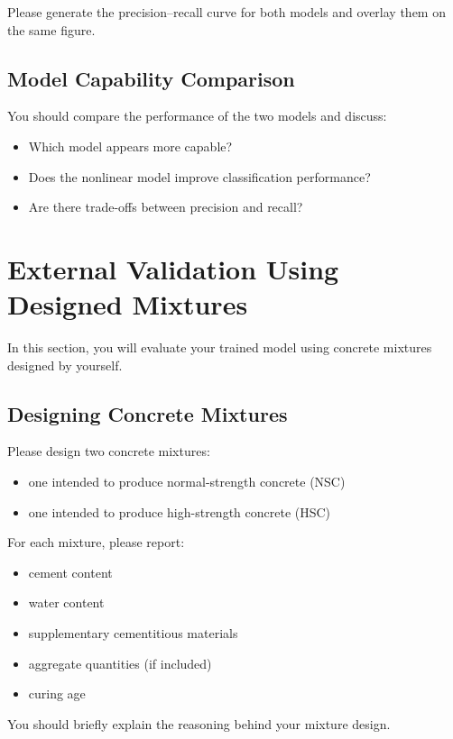 \documentclass[12pt]{article}
\begin{document}
Please generate the precision–recall curve for both models and overlay them on the same figure.

\subsection{Model Capability Comparison}

You should compare the performance of the two models and discuss:

\begin{itemize}
\item Which model appears more capable?
\item Does the nonlinear model improve classification performance?
\item Are there trade-offs between precision and recall?
\end{itemize}

\section{External Validation Using Designed Mixtures}

In this section, you will evaluate your trained model using concrete mixtures designed by yourself.

\subsection{Designing Concrete Mixtures}

Please design two concrete mixtures:

\begin{itemize}
\item one intended to produce normal-strength concrete (NSC)
\item one intended to produce high-strength concrete (HSC)
\end{itemize}

For each mixture, please report:

\begin{itemize}
\item cement content
\item water content
\item supplementary cementitious materials
\item aggregate quantities (if included)
\item curing age
\end{itemize}

You should briefly explain the reasoning behind your mixture design.
\end{document}
